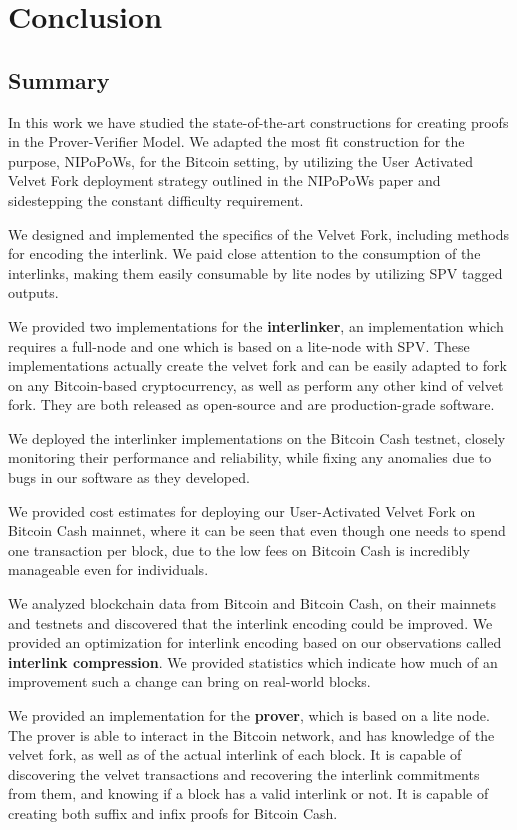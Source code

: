 \chapter{Conclusion}

\section{Summary}
In this work we have studied the state-of-the-art constructions for creating proofs in the Prover-Verifier Model. We adapted the most fit construction for the purpose, NIPoPoWs, for the Bitcoin setting, by utilizing the User Activated Velvet Fork deployment strategy outlined in the NIPoPoWs paper and sidestepping the constant difficulty requirement.


We designed and implemented the specifics of the Velvet Fork, including methods for encoding the interlink. We paid close attention to the consumption of the interlinks, making them easily consumable by lite nodes by utilizing SPV tagged outputs.

We provided two implementations for the \textbf{interlinker}, an implementation which requires a full-node and one which is based on a lite-node with SPV. These implementations actually create the velvet fork and can be easily adapted to fork on any Bitcoin-based cryptocurrency, as well as perform any other kind of velvet fork. They are both released as open-source and are production-grade software.

We deployed the interlinker implementations on the Bitcoin Cash testnet, closely monitoring their performance and reliability, while fixing any anomalies due to bugs in our software as they developed. 

We provided cost estimates for deploying our User-Activated Velvet Fork on Bitcoin Cash mainnet, where it can be seen that even though one needs to spend one transaction per block, due to the low fees on Bitcoin Cash is incredibly manageable even for individuals.

We analyzed blockchain data from Bitcoin and Bitcoin Cash, on their mainnets and testnets and discovered that the interlink encoding could be improved. We provided an optimization for interlink encoding based on our observations called \textbf{interlink compression}. We provided statistics which indicate how much of an improvement such a change can bring on real-world blocks.

We provided an implementation for the \textbf{prover}, which is based on a lite node. The prover is able to interact in the Bitcoin network, and has knowledge of the velvet fork, as well as of the actual interlink of each block. It is capable of discovering the velvet transactions and recovering the interlink commitments from them, and knowing if a block has a valid interlink or not. It is capable of creating both suffix and infix proofs for Bitcoin Cash.

